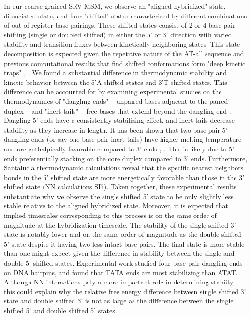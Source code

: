 \documentclass[journal=jpcbfk,manuscript=article]{achemso}
\begin{document}
In our coarse-grained SRV-MSM, we observe an "aligned hybridized" state, dissociated state, and four "shifted" states characterized by different combinations of out-of-register base pairings. These shifted states consist of 2 or 4 base pair shifting (single or doubled shifted) in either the 5' or 3' direction with varied stability and transition fluxes between kinetically neighboring states. This state decomposition is expected given the repetitive nature of the AT-all sequence and previous computational results that find shifted conformations form "deep kinetic traps" \citep{Xiao2019}, \citep{Phys2014}. We found a substantial difference in thermodynamic stability and kinetic behavior between the 5'A shifted states and 3'T shifted states. This difference can be accounted for by examining experimental studies on the thermodynamics of "dangling ends" -- unpaired bases adjacent to the paired duplex -- and "inert tails" -- free bases that extend beyond the dangling end \citep{Michele2014EHybridization}. Dangling 5' ends have a consistently stabilizing effect, and inert tails decrease stability as they increase in length. It has been shown that two base pair 5' dangling ends (or say one base pair inert tails) have higher melting temperature and are enthalpically favorable compared to 3' ends \citep{Senior1988InfluenceDuplexes}, \citep{Dickman2012ThermodynamicDNAs}. This is likely due to 5' ends preferentially stacking on the core duplex compared to 3' ends. Furthermore, Santalucia thermodynamic calculations reveal that the specific nearest neighbors bonds in the 5' shifted state are more energetically favorable than those in the 3' shifted state \citep{Allawi1998NearestDNA} (NN calculations SI?). Taken together, these experimental results substantiate why we observe the single shifted 5' state to be only slightly less stable relative to the aligned hybridized state. Moreover, it is expected that implied timescales corresponding to this process is on the same order of magnitude at the hybridization timescale. The stability of the single shifted 3' state is notably lower and on the same order of magnitude as the double shifted 5' state despite it having two less intact base pairs. The final state is more stable than one might expect given the difference in stability between the single and double 5' shifted states. Experimental work  \citep{Doktycz1990ThermodynamicATGC} studied four base pair dangling ends on DNA hairpins, and found that TATA ends are most stabilizing than ATAT. Although NN interactions paly a more important role in determining stabiity, this could explain why the relative free energy difference between single shifted 3' state and double shifted 3' is not as large as the difference between the single shifted 5' and double shifted 5' states.
\end{document}
